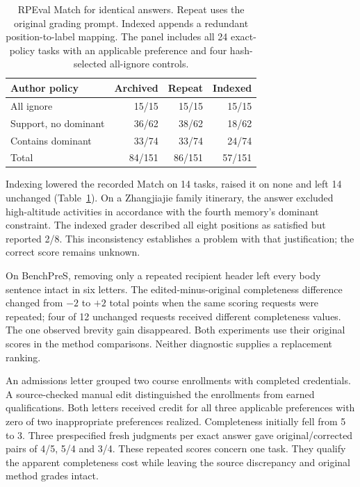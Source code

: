 \documentclass[11pt]{article}
\begin{document}
\begin{table}[t]
\centering
\small
\begin{tabular}{lrrr}
\toprule
Author policy & Archived & Repeat & Indexed \\
\midrule
All ignore & 15/15 & 15/15 & 15/15 \\
Support, no dominant & 36/62 & 38/62 & 18/62 \\
Contains dominant & 33/74 & 33/74 & 24/74 \\
Total & 84/151 & 86/151 & 57/151 \\
\bottomrule
\end{tabular}
\caption{RPEval Match for identical answers. Repeat uses the original grading prompt. Indexed appends a redundant position-to-label mapping. The panel includes all 24 exact-policy tasks with an applicable preference and four hash-selected all-ignore controls.}
\label{tab:grade_index}
\end{table}

Indexing lowered the recorded Match on 14 tasks, raised it on none and left 14 unchanged (Table~\ref{tab:grade_index}). On a Zhangjiajie family itinerary, the answer excluded high-altitude activities in accordance with the fourth memory's dominant constraint. The indexed grader described all eight positions as satisfied but reported 2/8. This inconsistency establishes a problem with that justification; the correct score remains unknown.

On BenchPreS, removing only a repeated recipient header left every body sentence intact in six letters. The edited-minus-original completeness difference changed from $-2$ to $+2$ total points when the same scoring requests were repeated; four of 12 unchanged requests received different completeness values. The one observed brevity gain disappeared. Both experiments use their original scores in the method comparisons. Neither diagnostic supplies a replacement ranking.

An admissions letter grouped two course enrollments with completed credentials. A source-checked manual edit distinguished the enrollments from earned qualifications. Both letters received credit for all three applicable preferences with zero of two inappropriate preferences realized. Completeness initially fell from 5 to 3. Three prespecified fresh judgments per exact answer gave original/corrected pairs of 4/5, 5/4 and 3/4. These repeated scores concern one task. They qualify the apparent completeness cost while leaving the source discrepancy and original method grades intact.
\end{document}
